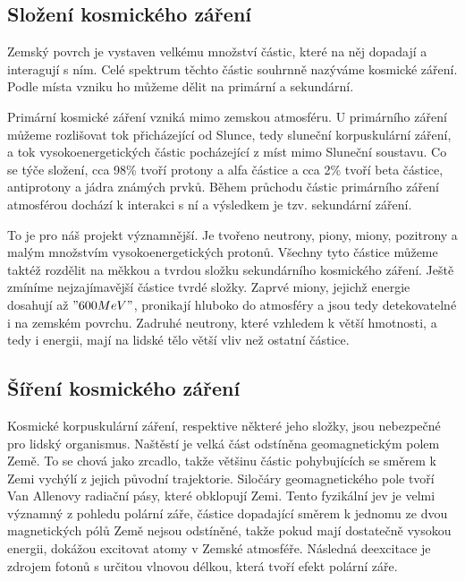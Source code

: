 \documentclass[12pt,a4paper]{article}
\begin{document}
\subsection*{Složení kosmického záření}
Zemský povrch je vystaven velkému množství částic,%
které na něj dopadají a interagují s ním. Celé
spektrum těchto částic souhrnně nazýváme kosmické záření. Podle místa vzniku ho můžeme dělit na
primární a sekundární.\par
Primární kosmické záření vzniká mimo zemskou atmosféru. U primárního záření můžeme rozlišovat tok
přicházející od Slunce, tedy sluneční korpuskulární záření, a tok vysokoenergetických částic
pocházející z míst mimo Sluneční soustavu. Co se týče složení, cca 98\% tvoří protony a alfa
částice a cca 2\% tvoří beta částice, antiprotony a jádra známých prvků. Během průchodu částic
primárního záření atmosférou dochází k interakci s ní a výsledkem je tzv. sekundární záření.\par
To je pro náš projekt významnější. Je tvořeno neutrony, piony, miony, pozitrony a malým množstvím
vysokoenergetických protonů. Všechny tyto částice můžeme taktéž rozdělit na měkkou a tvrdou složku
sekundárního kosmického záření. Ještě zmíníme nejzajímavější částice tvrdé složky. Zaprvé miony,
jejichž energie dosahují až $"600 MeV"$, pronikají hluboko do atmosféry a jsou tedy detekovatelné i
na zemském povrchu. Zadruhé neutrony, které vzhledem k větší hmotnosti, a tedy i energii, mají
na lidské tělo větší vliv než ostatní částice.\par
\subsection*{Šíření kosmického záření}
Kosmické korpuskulární záření, respektive některé jeho složky, jsou nebezpečné pro lidský organismus.
Naštěstí je velká část odstíněna geomagnetickým polem Země. To se chová jako zrcadlo, takže většinu
částic pohybujících se směrem k Zemi vychýlí z jejich původní trajektorie. Siločáry geomagnetického
pole tvoří Van Allenovy radiační pásy, které obklopují Zemi. Tento fyzikální jev je velmi významný
z pohledu polární záře, částice dopadající směrem k jednomu ze dvou magnetických pólů Země nejsou
odstíněné, takže pokud mají dostatečně vysokou energii, dokážou excitovat atomy v Zemské atmosféře.
Následná deexcitace je zdrojem fotonů s určitou vlnovou délkou, která tvoří efekt polární záře.\par
\end{document}
